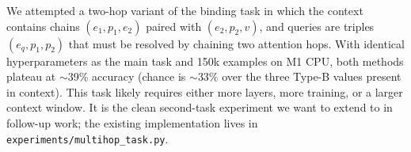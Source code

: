 \documentclass{article}
\begin{document}
We attempted a two-hop variant of the binding task in which the
context contains chains $(e_1, p_1, e_2)$ paired with
$(e_2, p_2, v)$, and queries are triples $(e_q, p_1, p_2)$ that must
be resolved by chaining two attention hops. With identical
hyperparameters as the main task and 150k examples on M1 CPU, both
methods plateau at $\sim$39\% accuracy (chance is $\sim$33\% over the
three Type-B values present in context). This task likely requires
either more layers, more training, or a larger context window. It is
the clean second-task experiment we want to extend to in follow-up
work; the existing implementation lives in
\texttt{experiments/multihop\_task.py}.
\end{document}
